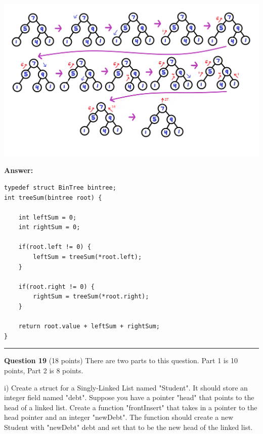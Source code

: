 \documentclass{exam}
\begin{document}
\includegraphics[scale=0.15]{tree}

\textbf{Answer:}

\begin{lstlisting}
typedef struct BinTree bintree;
int treeSum(bintree root) {

	int leftSum = 0;
	int rightSum = 0;

	if(root.left != 0) {
		leftSum = treeSum(*root.left);
	}

	if(root.right != 0) {
		rightSum = treeSum(*root.right);
	}
	
	return root.value + leftSum + rightSum;
}
\end{lstlisting}

\newpage




\begin{center}\noindent\rule{6in}{0.4pt}\end{center}

\textbf{Question 19} (18 points) There are two parts to this question. Part 1 is 10 points, Part 2 is 8 points.

i) Create a struct for a Singly-Linked List named "Student". It should store an integer field named "debt". Suppose you have a pointer "head" that points to the head of a linked list. Create a function "frontInsert" that takes in a pointer to the head pointer and an integer "newDebt". The function should create a new Student with "newDebt" debt and set that to be the new head of the linked list.
\end{document}
